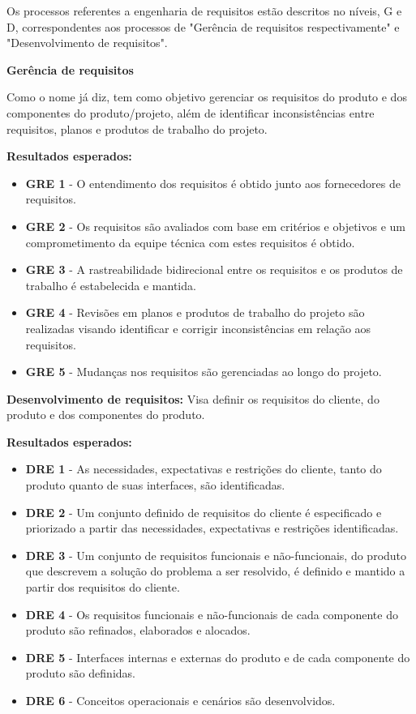 Os processos referentes a engenharia de requisitos estão descritos no níveis, G e D, correspondentes aos processos de "Gerência de requisitos respectivamente" e "Desenvolvimento de requisitos".

\textbf{Gerência de requisitos}

Como o nome já diz, tem como objetivo gerenciar os requisitos do produto e dos componentes do produto/projeto, além de identificar inconsistências entre requisitos, planos e produtos de trabalho do projeto.

\textbf{Resultados esperados:}
\begin{itemize}
\item \textbf{GRE 1} - O entendimento dos requisitos é obtido junto aos fornecedores de requisitos.
\item \textbf{GRE 2} - Os requisitos são avaliados com base em critérios e objetivos e um comprometimento da equipe técnica com estes requisitos é obtido.
\item \textbf{GRE 3} - A rastreabilidade bidirecional entre os requisitos e os produtos de trabalho é estabelecida e mantida.
\item \textbf{GRE 4} - Revisões em planos e produtos de trabalho do projeto são realizadas visando identificar e corrigir inconsistências em relação aos requisitos.
\item \textbf{GRE 5} - Mudanças nos requisitos são gerenciadas ao longo do projeto.
\end{itemize}

\textbf{Desenvolvimento de requisitos:}
Visa definir os requisitos do cliente, do produto e dos componentes do produto.

\textbf{Resultados esperados:}
\begin{itemize}
\item \textbf{DRE 1} - As necessidades, expectativas e restrições do cliente, tanto do produto quanto de suas interfaces, são identificadas.
\item \textbf{DRE 2} - Um conjunto definido de requisitos do cliente é especificado e priorizado a partir das necessidades, expectativas e restrições identificadas.
\item \textbf{DRE 3} - Um conjunto de requisitos funcionais e não-funcionais, do produto que descrevem a solução do problema a ser resolvido, é definido e mantido a partir dos requisitos do cliente.
\item \textbf{DRE 4} - Os requisitos funcionais e não-funcionais de cada componente do produto são refinados, elaborados e alocados.
\item \textbf{DRE 5} - Interfaces internas e externas do produto e de cada componente do produto são definidas.
\item \textbf{DRE 6} - Conceitos operacionais e cenários são desenvolvidos.
\end{itemize}
